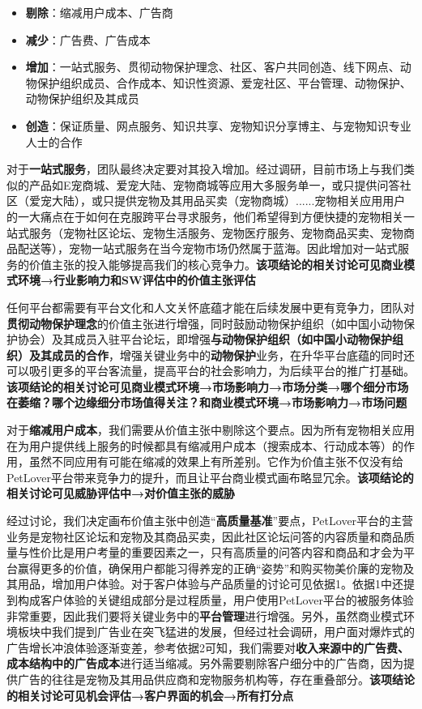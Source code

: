 \documentclass[a4paper]{ctexart}
\begin{document}
\begin{itemize}
  \item \textbf{剔除}：缩减用户成本、广告商
  \item \textbf{减少}：广告费、广告成本
  \item \textbf{增加}：一站式服务、贯彻动物保护理念、社区、客户共同创造、线下网点、动物保护组织成员、合作成本、知识性资源、爱宠社区、平台管理、动物保护、动物保护组织及其成员
  \item \textbf{创造}：保证质量、网点服务、知识共享、宠物知识分享博主、与宠物知识专业人士的合作
\end{itemize}

对于\textbf{一站式服务}，团队最终决定要对其投入增加。经过调研，目前市场上与我们类似的产品如E宠商城、爱宠大陆、宠物商城等应用大多服务单一，或只提供问答社区（爱宠大陆），或只提供宠物及其用品买卖（宠物商城）......宠物相关应用用户的一大痛点在于如何在克服跨平台寻求服务，他们希望得到方便快捷的宠物相关一站式服务（宠物社区论坛、宠物生活服务、宠物医疗服务、宠物商品买卖、宠物商品配送等），宠物一站式服务在当今宠物市场仍然属于蓝海。因此增加对一站式服务的价值主张的投入能够提高我们的核心竞争力。\textbf{该项结论的相关讨论可见商业模式环境→行业影响力和SW评估中的价值主张评估}

任何平台都需要有平台文化和人文关怀底蕴才能在后续发展中更有竞争力，团队对\textbf{贯彻动物保护理念}的价值主张进行增强，同时鼓励动物保护组织（如中国小动物保护协会）及其成员入驻平台论坛，即增强\textbf{与动物保护组织（如中国小动物保护组织）及其成员的合作}，增强关键业务中的\textbf{动物保护}业务，在升华平台底蕴的同时还可以吸引更多的平台客流量，提高平台的社会影响力，为后续平台的推广打基础。\textbf{该项结论的相关讨论可见商业模式环境→市场影响力→市场分类→哪个细分市场在萎缩？哪个边缘细分市场值得关注？和商业模式环境→市场影响力→市场问题}

对于\textbf{缩减用户成本}，我们需要从价值主张中剔除这个要点。因为所有宠物相关应用在为用户提供线上服务的时候都具有缩减用户成本（搜索成本、行动成本等）的作用，虽然不同应用有可能在缩减的效果上有所差别。它作为价值主张不仅没有给PetLover平台带来竞争力的提升，而且让平台商业模式画布略显冗余。\textbf{该项结论的相关讨论可见威胁评估中→对价值主张的威胁}

经过讨论，我们决定画布价值主张中创造“\textbf{高质量基准}”要点，PetLover平台的主营业务是宠物社区论坛和宠物及其商品买卖，因此社区论坛问答的内容质量和商品质量与性价比是用户考量的重要因素之一，只有高质量的问答内容和商品和才会为平台赢得更多的价值，确保用户都能习得养宠的正确“姿势”和购买物美价廉的宠物及其用品，增加用户体验。对于客户体验与产品质量的讨论可见依据1。依据1中还提到构成客户体验的关键组成部分是过程质量，用户使用PetLover平台的被服务体验非常重要，因此我们要将关键业务中的\textbf{平台管理}进行增强。另外，虽然商业模式环境板块中我们提到广告业在突飞猛进的发展，但经过社会调研，用户面对爆炸式的广告增长冲浪体验逐渐变差，参考依据2可知，我们需要对\textbf{收入来源中的广告费、成本结构中的广告成本}进行适当缩减。另外需要剔除客户细分中的广告商，因为提供广告的往往是宠物及其用品供应商和宠物服务机构等，存在重叠部分。\textbf{该项结论的相关讨论可见机会评估→客户界面的机会→所有打分点}
\end{document}
